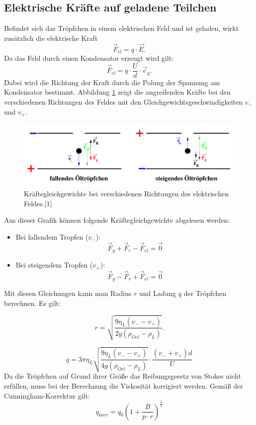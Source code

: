 \documentclass[11pt,ngerman,a4paper]{article}
\begin{document}
\subsection{Elektrische Kräfte auf geladene Teilchen} 
Befindet sich das Tröpfchen in einem elektrischen Feld und ist geladen, wirkt zusätzlich die elektrische Kraft
\[
\vec F_{el} = q\cdot \vec E \mathrm{.}
\]
Da das Feld durch einen Kondensator erzeugt wird gilt:
\[
\vec F_{el} = q\cdot \frac{U}{d} \cdot \vec e_y\mathrm{.}
\]
Dabei wird die Richtung der Kraft durch die Polung der Spannung am Kondensator bestimmt. Abbildung \ref{feldgg} zeigt die angreifenden Kräfte bei den verschiedenen Richtungen des Feldes mit den Gleichgewichtsgeschwindigkeiten $v_-$ und $v_+$. 
\begin{figure}[h]
\centering
\includegraphics[scale=0.35]{abb1.png}
\caption{Kräftegleichgewichte bei verschiedenen Richtungen des elektrischen Feldes.[1]}
\label{feldgg}
\end{figure}
Aus dieser Grafik können folgende Kräftegleichgewichte abgelesen werden:
\begin{itemize}
\item Bei fallendem Tropfen ($v_-$):
\begin{equation}
\vec F_g+ \vec F_r - \vec F_{el}= \vec 0
\label{gg-}
\end{equation}

\item Bei steigendem Tropfen ($v_+$):
\begin{equation}
\vec F_g -\vec F_r +\vec F_{el}= \vec 0
\label{gg+}
\end{equation}
\end{itemize}
Mit diesen Gleichungen kann man Radius $r$ und Ladung $q$ der Tröpfchen berechnen. Es gilt:

\begin{equation}
r = \sqrt{\frac{9 \eta_L (v_--v_+)}{2g\left(\rho_{Oel}-\rho_{L}\right)}}\mathrm{.}
\label{r+-}
\end{equation}

\begin{equation}
q = 3\pi\eta_L\sqrt{\frac{9 \eta_L (v_--v_+)}{4g\left(\rho_{Oel}-\rho_{L}\right)}}\cdot \frac{(v_-+v_+)d}{U}
\label{q+-}
\end{equation}
Da die Tröpfchen auf Grund ihrer Größe das Reibungsgesetz von Stokes nicht erfüllen, muss bei der Berechnung die Viskosität korrigiert werden. Gemäß der Cunningham-Korrektur gilt:
\begin{equation}
q_{korr} = q_0 \left( 1+ \frac B{p\cdot r}\right)^{\frac32}
\end{equation}
\end{document}

